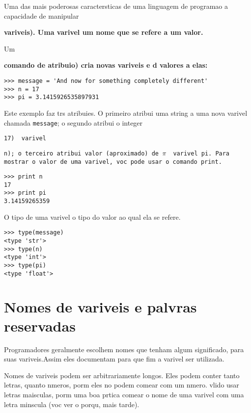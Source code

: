 Uma das mais poderosas caracter sticas de uma linguagem de programa  o   a 
capacidade de manipular {\bf vari veis). Uma vari vel   um nome 
que se refere a um valor.

Um {\bf comando de atribui  o) cria novas vari veis e d  
valores a elas:

\beforeverb
\begin{verbatim}
>>> message = 'And now for something completely different'
>>> n = 17
>>> pi = 3.1415926535897931
\end{verbatim}
\afterverb
%
Este exemplo faz tr s atribui  es. O primeiro atribui uma string 
a uma nova vari vel chamada {\tt message}; 
o segundo atribui o integer {\tt 17)   vari vel {\tt n); o terceiro 
atribui valor (aproximado) de $\pi$   vari vel {\tt pi}.
Para mostrar o valor de uma vari vel, voc  pode usar o comando print.
\beforeverb
\begin{verbatim}
>>> print n
17
>>> print pi
3.14159265359
\end{verbatim}
\afterverb
%
O tipo de uma vari vel   o tipo do valor ao qual ela se refere.
\beforeverb
\begin{verbatim}
>>> type(message)
<type 'str'>
>>> type(n)
<type 'int'>
>>> type(pi)
<type 'float'>
\end{verbatim}
\afterverb
%

\section{Nomes de vari veis e pal vras reservadas}

Programadores geralmente escolhem nomes que tenham algum significado, para 
suas vari veis.Assim eles documentam para que fim a vari vel ser  utilizada.

Nomes de vari veis podem ser arbitrariamente longos. Eles podem conter 
tanto letras, quanto n meros, por m eles n o podem come ar com um n mero.
  v lido usar letras mai sculas, por m   uma boa pr tica come ar o nome de uma vari vel 
com uma letra min scula (voc  ver  o porqu , mais tarde).

}}}}
